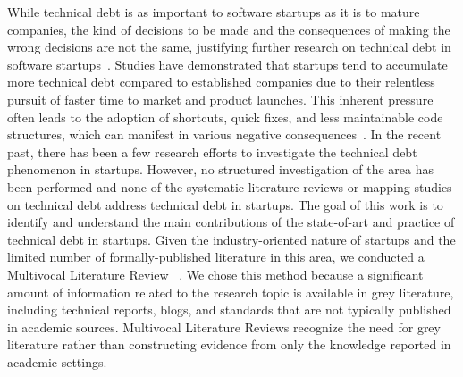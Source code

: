 While technical debt is as important to software startups as it is to mature companies, the kind of decisions to be made and the consequences of making the wrong decisions are not the same, justifying further research on technical debt in software startups~\cite{Unterkalmsteiner16}.
Studies have demonstrated that startups tend to accumulate more technical debt compared to established companies due to their relentless pursuit of faster time to market and product launches.
This inherent pressure often leads to the adoption of shortcuts, quick fixes, and less maintainable code structures, which can manifest in various negative consequences~\cite{Giardino2016,Klotins882019}.
In the recent past, there has been a few research efforts to investigate the technical debt phenomenon in startups.
However, no structured investigation of the area has been performed and none of the systematic literature reviews or mapping studies on technical debt address technical debt in startups.
The goal of this work is to identify and understand the main contributions of the state-of-art and practice of technical debt in startups.
Given the industry-oriented nature of startups and the limited number of formally-published literature in this area, we conducted a Multivocal Literature Review ~\cite{GAROUSI2019101}.
We chose this method because a significant amount of information related to the research topic is available in grey literature, including technical reports, blogs, and standards that are not typically published in academic sources.
Multivocal Literature Reviews recognize the need for grey literature rather than constructing evidence from only the knowledge reported in academic settings.


